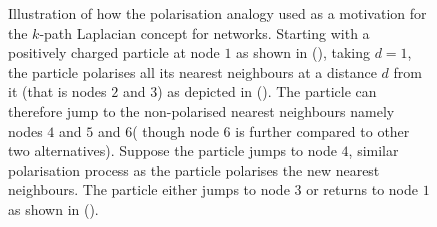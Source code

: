 \documentclass[10pt,a4paper]{article}
\begin{document}
\begin{figure}[H]
\begin{subfigure}[b]{0.3\textwidth}
    	    	\end{subfigure}
    	    	\caption{ Illustration of how the polarisation analogy used as a motivation for the $k$-path Laplacian concept for networks. Starting with a positively charged particle at node $1$ as shown in (), taking $d=1$, the particle polarises all its nearest neighbours at a distance $d$ from it (that is nodes $2$ and $3$) as depicted in (). The particle can therefore jump to the non-polarised nearest neighbours namely nodes $4$ and $5$ and $6$( though node $6$ is further compared to other two alternatives). Suppose the particle jumps to node $4$, similar polarisation process as the particle polarises the new nearest neighbours. The particle either jumps to node $3$ or returns to node $1$ as shown in ().}
    	    	\label{1-path-particle}
    	    \end{figure}
    	    \vspace{1cm}
    	    
\end{document}
